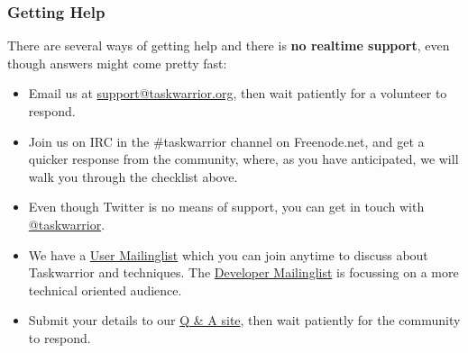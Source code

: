 \documentclass[t,handout]{beamer}
\begin{document}
\begin{frame}[fragile]\frametitle{Getting Help}
    There are several ways of getting help and there is \textbf{no realtime support}, even though answers might come pretty fast:

    \begin{itemize}
        \item Email us at \href{mailto:support@taskwarrior.org}{support@taskwarrior.org}, then wait patiently for a volunteer to respond.
        \item Join us on IRC in the \#taskwarrior channel on Freenode.net, and get a quicker response from the community, where, as you have anticipated, we will walk you through the checklist above.
        \item Even though Twitter is no means of support, you can get in touch with \href{https://twitter.com/taskwarrior}{@taskwarrior}.
        \item We have a \href{https://groups.google.com/forum/\#!forum/taskwarrior-user}{User Mailinglist} which you can join anytime to discuss about Taskwarrior and techniques. The \href{https://groups.google.com/forum/\#!forum/taskwarrior-dev}{Developer Mailinglist} is focussing on a more technical oriented audience.
        \item Submit your details to our \href{https://answers.tasktools.org}{Q \& A site}, then wait patiently for the community to respond.
    \end{itemize}

\end{frame}

\end{document}
